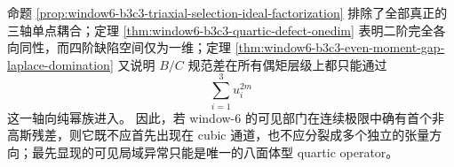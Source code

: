 \begin{remark}\label{rem:window6-visible-gff-unique-quartic-residual-evidence}
命题 \ref{prop:window6-b3c3-triaxial-selection-ideal-factorization} 排除了全部真正的三轴单点耦合；定理 \ref{thm:window6-b3c3-quartic-defect-onedim} 表明二阶完全各向同性，而四阶缺陷空间仅为一维；定理 \ref{thm:window6-b3c3-even-moment-gap-laplace-domination} 又说明 \(B/C\) 规范差在所有偶矩层级上都只能通过
\[
\sum_{i=1}^{3}u_i^{2m}
\]
这一轴向纯幂族进入。
因此，若 window-\(6\) 的可见部门在连续极限中确有首个非高斯残差，则它既不应首先出现在 cubic 通道，也不应分裂成多个独立的张量方向；最先显现的可见局域异常只能是唯一的八面体型 quartic operator。
\end{remark}

\endinput

